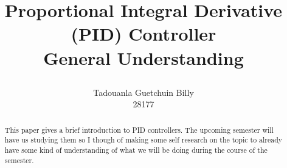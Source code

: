 \documentclass[11pt, a4paper]{article}
\title{

  {
    \bfseries
  \color{navyblue} Proportional Integral Derivative (PID) Controller
  }\\

  \large General Understanding
}
\author{
  Tadouanla Guetchuin Billy \\ 
  28177
}
\begin{document}
\maketitle
{}
\setcounter{page}{1}

\begin{abstract}
  This paper gives a brief introduction to PID controllers. The upcoming semester will have us
  studying them so I though of making some self research on the topic to already have some
  kind of understanding of what we will be doing during the course of the semester.
\end{abstract}

\tableofcontents
\newpage
{}
\setcounter{page}{1}

\end{document}
